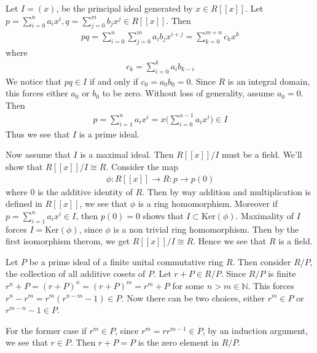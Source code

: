 \documentclass[12pt]{exam}
\theoremstyle{plain} %
\theoremstyle{definition} %
\theoremstyle{remark} %
\begin{document}
\begin{questions}
  \question
  \begin{solution}
    Let $I = (x)$, be the principal ideal generated by $x \in
    R[[x]]$. Let $p = \sum_{i = 0}^{n} a_i x^i, q = \sum_{j =
    0}^{m} b_jx^j \in R[[x]]$. Then
    \begin{align*}
      pq = \sum_{i = 0}^{n} \sum_{j = 0}^{m} a_ib_j x^{i + j} =
      \sum_{k = 0}^{m+n} c_k x^k
    \end{align*}
    where
    \begin{align*}
      c_k = \sum_{i = 0}^{k} a_{i}b_{k-i}
    \end{align*}
    We notice that $pq \in I$ if and only if $c_0 = a_0b_0 = 0$.
    Since $R$ is an integral domain, this forces either $a_0$ or
    $b_0$ to be zero. Without loss of generality, assume $a_0 = 0$. Then
    \begin{align*}
      p = \sum_{i = 1}^{n} a_i x^i = x \Big( \sum_{i = 0}^{n-1} a_i
      x^i \Big) \in I
    \end{align*}
    Thus we see that $I$ is a prime ideal.

    Now assume that $I$ is a maximal ideal. Then $R[[x]]/I$ must be a
    field. We'll show that $R[[x]]/I \cong R$. Consider the map
    \begin{align*}
      \phi : R[[x]] \to R : p \to p(0)
    \end{align*}
    where $0$ is the additive identity of $R$. Then by way addition
    and multiplication is defined in $R[[x]]$, we see that $\phi$ is
    a ring homomorphism. Moreover if $p = \sum_{i = 1}^{n} a_i x^i
    \in I$, then $p(0) = 0$ shows that $I \subset
    \textrm{Ker}(\phi)$. Maximality of $I$ forces $I =
    \textrm{Ker}(\phi)$, since $\phi$ is a non trivial ring
    homomorphism. Then by the first isomorphism therom, we get
    $R[[x]]/I \cong R$. Hence we see that $R$ is a field.
  \end{solution}

  \question
  \begin{solution}
    Let $P$ be a prime ideal of a finite unital commutative ring $R$.
    Then consider $R/P$, the collection of all additive cosets of
    $P$. Let $r + P \in R/P$. Since $R/P$ is finite $r^n + P = (r +
    P)^n = (r + P)^m =  r^m + P$ for some $n > m \in \mathbb{N}$.
    This forces $r^n - r^m = r^m(r^{n-m} - 1) \in P$. Now there can
    be two choices, either $r^m \in P$ or $r^{m-n} -1 \in P$.

    For the former case if $r^m \in P$, since $r^m = rr^{m-1} \in P$,
    by an induction argument, we see that $r \in P$. Then $r + P = P$
    is the zero element in $R/P$.


\end{solution}
\end{questions}
\end{document}
